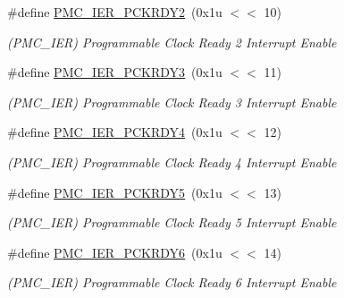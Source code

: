 \begin{DoxyCompactItemize}
\mbox{\label{group__SAMS70__PMC_ga24a074ed0f89ac6b1509943b02659d3b}} 
\#define \mbox{\hyperlink{group__SAMS70__PMC_ga24a074ed0f89ac6b1509943b02659d3b}{P\+M\+C\+\_\+\+I\+E\+R\+\_\+\+P\+C\+K\+R\+D\+Y2}}~(0x1u $<$$<$ 10)
\begin{DoxyCompactList}\small\item\em (P\+M\+C\+\_\+\+I\+ER) Programmable Clock Ready 2 Interrupt Enable \end{DoxyCompactList}\item 
\mbox{\label{group__SAMS70__PMC_gacae87261dc9fb52ec79a1a380fcdf8fd}} 
\#define \mbox{\hyperlink{group__SAMS70__PMC_gacae87261dc9fb52ec79a1a380fcdf8fd}{P\+M\+C\+\_\+\+I\+E\+R\+\_\+\+P\+C\+K\+R\+D\+Y3}}~(0x1u $<$$<$ 11)
\begin{DoxyCompactList}\small\item\em (P\+M\+C\+\_\+\+I\+ER) Programmable Clock Ready 3 Interrupt Enable \end{DoxyCompactList}\item 
\mbox{\label{group__SAMS70__PMC_ga31be9f0cda08e0f5d90c39f9a45e3401}} 
\#define \mbox{\hyperlink{group__SAMS70__PMC_ga31be9f0cda08e0f5d90c39f9a45e3401}{P\+M\+C\+\_\+\+I\+E\+R\+\_\+\+P\+C\+K\+R\+D\+Y4}}~(0x1u $<$$<$ 12)
\begin{DoxyCompactList}\small\item\em (P\+M\+C\+\_\+\+I\+ER) Programmable Clock Ready 4 Interrupt Enable \end{DoxyCompactList}\item 
\mbox{\label{group__SAMS70__PMC_gafabc6471c503bf8f0a248d24663a7025}} 
\#define \mbox{\hyperlink{group__SAMS70__PMC_gafabc6471c503bf8f0a248d24663a7025}{P\+M\+C\+\_\+\+I\+E\+R\+\_\+\+P\+C\+K\+R\+D\+Y5}}~(0x1u $<$$<$ 13)
\begin{DoxyCompactList}\small\item\em (P\+M\+C\+\_\+\+I\+ER) Programmable Clock Ready 5 Interrupt Enable \end{DoxyCompactList}\item 
\mbox{\label{group__SAMS70__PMC_ga7c5d0e3f5c33aee7b1daad878b63e145}} 
\#define \mbox{\hyperlink{group__SAMS70__PMC_ga7c5d0e3f5c33aee7b1daad878b63e145}{P\+M\+C\+\_\+\+I\+E\+R\+\_\+\+P\+C\+K\+R\+D\+Y6}}~(0x1u $<$$<$ 14)
\begin{DoxyCompactList}\small\item\em (P\+M\+C\+\_\+\+I\+ER) Programmable Clock Ready 6 Interrupt Enable \end{DoxyCompactList}\item 
$$
\end{DoxyCompactItemize}
